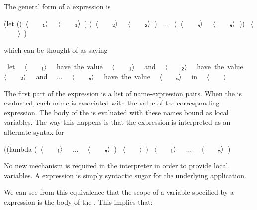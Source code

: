 \noindent
The general form of a  expression is

\begin{codeBlock}
(let ((~\(\langle \)~~~~\(_{\mono{1}}\rangle \)~ ~\(\langle \)~~~~\(_{\mono{1}}\rangle \)~)
      (~\(\langle \)~~~~\(_{\mono{2}}\rangle \)~ ~\(\langle \)~~~~\(_{\mono{2}}\rangle \)~)
      ~\( \dots \)~
      (~\(\langle \)~~~~\(_{\monoItalic{n}}\rangle \)~ ~\(\langle \)~~~~\(_{\monoItalic{n}}\rangle \)~))
   ~\(\langle \)~~~~\(\rangle \)~)
\end{codeBlock}

\noindent
which can be thought of as saying

\begin{codeBlock}
~\mbox{let}~ ~\(\langle \)~~~~\(_{\mono{1}}\rangle \)~ ~\mbox{have the value}~ ~\(\langle \)~~~~\(_{\mono{1}}\rangle \)~ ~\mbox{and}~
    ~\(\langle \)~~~~\(_{\mono{2}}\rangle \)~ ~\mbox{have the value}~ ~\(\langle \)~~~~\(_{\mono{2}}\rangle \)~ ~\mbox{and}~
    ~\( \dots \)~
    ~\(\langle \)~~~~\(_{\monoItalic{n}}\rangle \)~ ~\mbox{have the value}~ ~\(\langle \)~~~~\(_{\monoItalic{n}}\rangle \)~
~\mbox{in}~  ~\(\langle \)~~~~\(\rangle \)~
\end{codeBlock}

\noindent
The first part of the  expression is a list of name-expression pairs.
When the  is evaluated, each name is associated with the value of the
corresponding expression.  The body of the  is evaluated with these
names bound as local variables.  The way this happens is that the 
expression is interpreted as an alternate syntax for

\begin{codeBlock}
((lambda (~\(\langle \)~~~~\(_{\mono{1}}\rangle \)~ ~\( \dots \)~ ~\(\langle \)~~~~\(_{\monoItalic{n}}\rangle \)~)
    ~\(\langle \)~~~~\(\rangle \)~)
 ~\(\langle \)~~~~\(_{\mono{1}}\rangle \)~
 ~\( \dots \)~
 ~\(\langle \)~~~~\(_{\monoItalic{n}}\rangle \)~)
\end{codeBlock}

\noindent
No new mechanism is required in the interpreter in order to provide local
variables. A  expression is simply syntactic sugar for the
underlying  application.

We can see from this equivalence that the scope of a variable specified by a
 expression is the body of the . This implies that:

